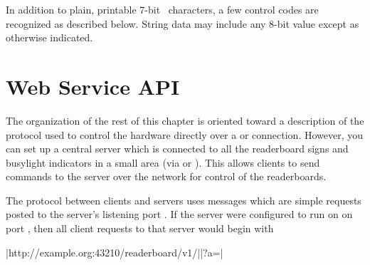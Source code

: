 In addition to plain, printable 7-bit \ascii\ characters, a few control codes are
recognized as described below. String data may include any 8-bit value except as otherwise
indicated.

%
%
%
\section{Web Service API}
The organization of the rest of this chapter is oriented toward a description of the
protocol used to control the hardware directly over a  or 
connection. However, you can set up a central server which is connected to all the
readerboard signs and busylight indicators in a small area (via  or ).
This allows clients to send commands to the server over the network for control of the readerboards.

The protocol between clients and servers uses messages which are simple  requests
posted to the server's listening port . If the server were configured to run
on  on port , then all client requests to that server would begin with

\begin{Coding}
	|http://example.org:43210/readerboard/v1/||?a=|
\end{Coding}

